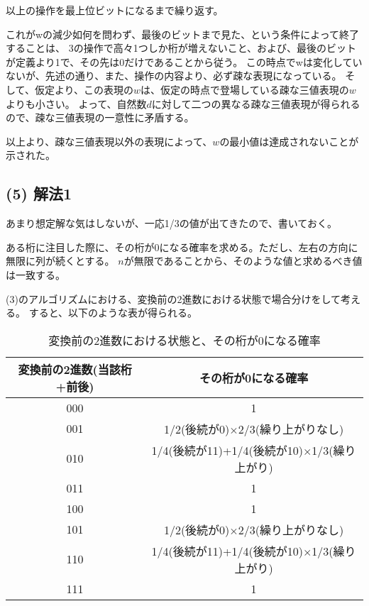 \documentclass[a4paper, 10pt, dvipdfmx]{jlreq}
\begin{document}
以上の操作を最上位ビットになるまで繰り返す。

これがwの減少如何を問わず、最後のビットまで見た、という条件によって終了することは、
3の操作で高々1つしか桁が増えないこと、および、最後のビットが定義より1で、その先は0だけであることから従う。
この時点でwは変化していないが、先述の通り、また、操作の内容より、必ず疎な表現になっている。
そして、仮定より、この表現の$w$は、仮定の時点で登場している疎な三値表現の$w$よりも小さい。
よって、自然数$d$に対して二つの異なる疎な三値表現が得られるので、疎な三値表現の一意性に矛盾する。

以上より、疎な三値表現以外の表現によって、$w$の最小値は達成されないことが示された。

\subsection*{(5) 解法1}

あまり想定解な気はしないが、一応1/3の値が出てきたので、書いておく。

ある桁に注目した際に、その桁が0になる確率を求める。ただし、左右の方向に無限に列が続くとする。
$n$が無限であることから、そのような値と求めるべき値は一致する。

(3)のアルゴリズムにおける、変換前の2進数における状態で場合分けをして考える。
すると、以下のような表が得られる。

\begin{table}[hbtp]
  \caption{変換前の2進数における状態と、その桁が0になる確率}
  \centering
  \begin{tabular}{cc}
    \toprule
    変換前の2進数(当該桁+前後) & その桁が0になる確率                              \\
    \midrule
    000             & 1                                       \\
    001             & 1/2(後続が0)$\times$2/3(繰り上がりなし)           \\
    010             & 1/4(後続が11)+1/4(後続が10)$\times$1/3(繰り上がり) \\
    011             & 1                                       \\
    100             & 1                                       \\
    101             & 1/2(後続が0)$\times$2/3(繰り上がりなし)           \\
    110             & 1/4(後続が11)+1/4(後続が10)$\times$1/3(繰り上がり) \\
    111             & 1                                       \\
    \bottomrule
  \end{tabular}
\end{table}
\end{document}
